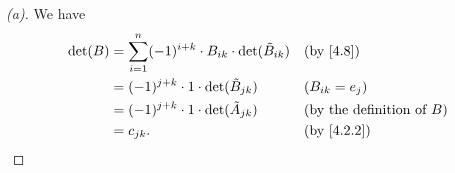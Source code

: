 \begin{proof}[(a)]
	We have
	\begin{align*}
		\det(B) & = \sum_{i = 1}^n (-1)^{i + k} \cdot B_{i k} \cdot \det(\tilde{B}_{i k}) &  & \by{4.8}                            \\
		        & = (-1)^{j + k} \cdot 1 \cdot \det(\tilde{B}_{j k})                      &  & (B_{i k} = e_j)                     \\
		        & = (-1)^{j + k} \cdot 1 \cdot \det(\tilde{A}_{j k})                      &  & \text{(by the definition of \(B\))} \\
		        & = c_{j k}.                                                              &  & \by{4.2.2}
	\end{align*}
\end{proof}


